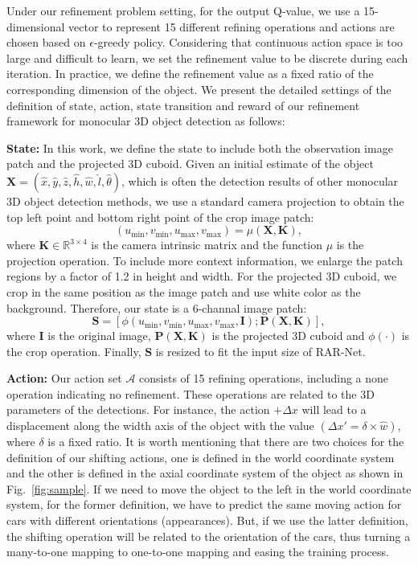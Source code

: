 \documentclass[runningheads]{llncs}
\begin{document}
Under our refinement problem setting, for the output Q-value, we use a 15-dimensional vector to represent 15 different refining operations and actions are chosen based on $\epsilon$-greedy policy. Considering that continuous action space is too large and difficult to learn, we set the refinement value to be discrete during each iteration. In practice, we define the refinement value as a fixed ratio of the corresponding dimension of the object. We present the detailed settings of the definition of state, action, state transition and reward of our refinement framework for monocular 3D object detection as follows:

\noindent
\textbf{State:} In this work, we define the state to include both the observation image patch and the projected 3D cuboid. Given an initial estimate of the object $\mathbf{X} = (\hat{x}, \hat{y}, \hat{z}, \hat{h}, \hat{w}, \hat{l},\hat{\theta})$, which is often the detection results of other monocular 3D object detection methods, we use a standard camera projection  to obtain the top left point and bottom right point of the crop image patch:
\begin{equation}
(u_{\min}, v_{\min}, u_{\max}, v_{\max}) = \mu(\mathbf{X}, \mathbf{K}),
\end{equation}
where $\mathbf{K} \in \mathbb{R}^{3\times4}$ is the camera intrinsic matrix and the function $\mu$ is the projection operation.
To include more context information, we enlarge the patch regions by a factor of 1.2 in height and width. For the projected 3D cuboid, we crop in the same position as the image patch and use white color as the background. Therefore, our state is a 6-channal image patch:
\begin{equation}
\mathbf{S} = [\phi(u_{\min}, v_{\min}, u_{\max}, v_{\max}, \mathbf{I}); \mathbf{P}(\mathbf{X}, \mathbf{K})],
\end{equation}
where $\mathbf{I}$ is the original image, $\mathbf{P}(\mathbf{X}, \mathbf{K})$ is the projected 3D cuboid and $\phi\!\left(\cdot\right)$ is the crop operation. Finally, $\mathbf{S}$ is resized to fit the input size of RAR-Net.
 
\noindent
\textbf{Action:} Our action set $\mathcal{A}$ consists of 15 refining operations, including a none operation indicating no refinement. These operations are related to the 3D parameters of the detections. For instance, the action $+\Delta x$ will lead to a displacement along the width axis of the object with the value $(\Delta x' = \delta \times \hat{w})$, where $\delta$ is a fixed ratio. It is worth mentioning that there are two choices for the definition of our shifting actions, one is defined in the world coordinate system and the other is defined in the axial coordinate system of the object as shown in Fig.~\ref{fig:sample}. If we need to move the object to the left in the world coordinate system, for the former definition, we have to predict the same moving action for cars with different orientations (appearances). But, if we use the latter definition, the shifting operation will be related to the orientation of the cars, thus turning a many-to-one mapping to one-to-one mapping and easing the training process. 
\end{document}
